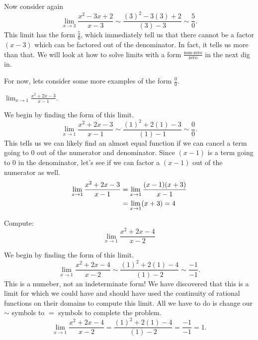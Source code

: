 \documentclass{ximera}
\begin{document}
Now consider again
\[
\lim_{x\to 3}\frac{x^2-3x+2}{x-3} \sim \frac{(3)^2-3(3)+2}{(3)-3} \sim \frac{5}{0}.
\]
This limit has the form $\frac{5}{0}$, which immediately tell us that
there cannot be a factor $(x-3)$ which can be factored out of the
denominator.  In fact, it tells us more than that.  We will look at
how to solve limits with a form $\frac{\text{non-zero}}{\text{zero}}$
in the next dig in.

For now, lets consider some more examples of the form $\frac{0}{0}$.

\begin{example}
$\lim_{x\to1}\frac{x^2+2x-3}{x-1}$. 
\begin{explanation}
We begin by finding the form of this limit.
\[
\lim_{x\to1}\frac{x^2+2x-3}{x-1} \sim \frac{(1)^2+2(1)-3}{(1)-1} \sim
\frac{0}{0}.
\]
This tells us we can likely find an almost equal function if we can
cancel a term going to $0$ out of the numerator and denominator.  Since
$(x-1)$ is a term going to $0$ in the denominator, let's see if we can
factor a $(x-1)$ out of the numerator as well.
\begin{align*}
\lim_{x\to1}{x^2+2x-3\over x-1}&=\lim_{x\to1}{(x-1)(x+3)\over x-1} \\
&=\lim_{x\to1}(x+3)=4
\end{align*}
\end{explanation}
\end{example}

\begin{example}
  Compute:
  \[
  \lim_{x\to1}\frac{x^2+2x-4}{x-2}
  \]
\begin{explanation}
  We begin by finding the form of this
  limit.
  \[
  \lim_{x\to1}\frac{x^2+2x-4}{x-2} \sim\frac{(1)^2+2(1)-4}{(1)-2} \sim \frac{-1}{-1}.
  \]
  This is a numeber, not an indeterminate form! We have discovered
  that this is a limit for which we could have and should have used
  the continuity of rational functions on their domains to compute
  this limit.  All we have to do is change our $\sim$ symbols to $=$
  symbols to complete the problem.
  \[
  \lim_{x\to1}\frac{x^2+2x-4}{x-2} = \frac{(1)^2+2(1)-4}{(1)-2} =
  \frac{-1}{-1} =1.
  \]
\end{explanation}
\end{example}
\end{document}
